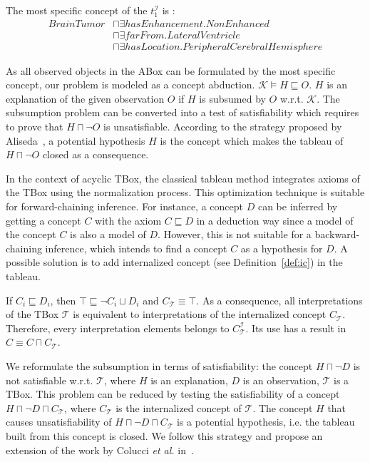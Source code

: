\documentclass{article}
\begin{document}
The most specific concept of the  $t_1^\mathcal{I}$ is :\vspace{-0.3cm}
\begin{align*}
 BrainTumor&\sqcap \exists hasEnhancement.NonEnhanced \\
 &\sqcap \exists farFrom.LateralVentricle\\
 &\sqcap \exists hasLocation.PeripheralCerebralHemisphere
\end{align*}

As all observed objects in the ABox can be formulated by the most specific concept, our problem is modeled as a concept abduction.
$\mathcal{K}\vDash H\sqsubseteq O$.  $H$ is an explanation of the given observation $O$ if $H$ is subsumed by $O$ w.r.t.  $\mathcal{K}$. 
The subsumption problem can be converted into a test of satisfiability which requires to prove that $H\sqcap \neg O$ is unsatisfiable.
According to the strategy proposed by Aliseda~\cite{aliseda1997seeking}, a potential hypothesis $H$ is the concept which makes the tableau of  $H\sqcap \neg O$ closed as a consequence.

In the context of acyclic TBox, the classical tableau method integrates axioms of the TBox using the normalization process. This optimization technique is suitable for forward-chaining inference.
For instance, a concept $D$ can be inferred by getting a concept $C$ with the axiom $C\sqsubseteq D$ in a deduction way since a model of the concept $C$ is also a model of $D$.
However, this is not suitable for a backward-chaining inference, which intends to find a concept $C$ as a hypothesis for $D$. A possible solution is to add
internalized concept (see Definition~\ref{def:ic}) in the tableau.

If $C_i \sqsubseteq D_i$, then $\top \sqsubseteq \neg C_i  \sqcup D_i$ and  $C_\mathcal{T}\equiv \top$. 
As a consequence, all interpretations of the TBox $\mathcal{T}$ is equivalent to interpretations of the internalized concept $C_\mathcal{T}$.
Therefore, every interpretation elements belongs to  $C_\mathcal{T}^\mathcal{I}$. 
Its use has a result in $C\equiv C\sqcap C_\mathcal{T}$.


We reformulate the subsumption in terms of satisfiability: the concept $H \sqcap \neg D$ is not satisfiable w.r.t. $\mathcal{T}$, where $H$ is an explanation, $D$ is an observation,
$\mathcal{T}$ is a TBox. This problem can be reduced by testing the satisfiability of a concept $ H\sqcap \neg D \sqcap C_\mathcal{T}$, where $ C_\mathcal{T}$ is the internalized concept of $\mathcal{T}$.
The concept $H$ that causes unsatisfiability of $H\sqcap\neg D\sqcap C_\mathcal{T}$ is a potential hypothesis, i.e. the tableau built from this concept is closed.
We follow this strategy and propose an extension of the work by Colucci \textit{et al.} in~\cite{colucci2004uniform}.
\end{document}
